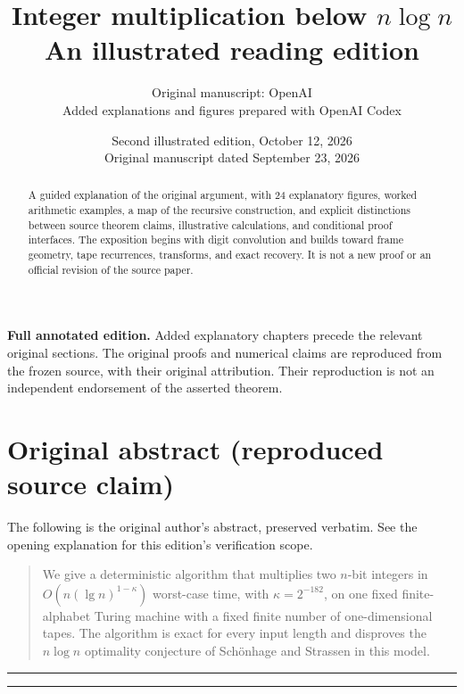 \documentclass[11pt]{article}
\title{Integer multiplication below $n\log n$\\[8pt]\large An illustrated reading edition}
\author{Original manuscript: OpenAI\\[5pt]\small Added explanations and figures prepared with OpenAI Codex}
\date{Second illustrated edition, October 12, 2026\\\small Original manuscript dated September 23, 2026}
\theoremstyle{definition}
\begin{document}
\maketitle
\begin{abstract}
A guided explanation of the original argument, with 24 explanatory figures,
worked arithmetic examples, a map of the recursive construction, and explicit
distinctions between source theorem claims, illustrative calculations, and
conditional proof interfaces. The exposition begins with digit convolution
and builds toward frame geometry, tape recurrences, transforms, and exact
recovery. It is not a new proof or an official revision of the source paper.
\end{abstract}

\noindent\textbf{Full annotated edition.} Added explanatory chapters precede
the relevant original sections. The original proofs and numerical claims
are reproduced from the frozen source, with their original attribution.
Their reproduction is not an independent endorsement of the asserted theorem.
\tableofcontents
\clearpage




\clearpage\section*{Original abstract (reproduced source claim)}
\noindent The following is the original author's abstract, preserved verbatim.
See the opening explanation for this edition's verification scope.
\begin{quote}

We give a deterministic algorithm that multiplies two $n$-bit integers
in $O(n(\lg n)^{1-\kappa})$ worst-case time, with
$\kappa=2^{-182}$, on one fixed finite-alphabet Turing machine with a
fixed finite number of one-dimensional tapes. The algorithm is exact
for every input length and disproves the $n\log n$ optimality conjecture
of Sch\"onhage and Strassen in this model.
\end{quote}
\par\bigskip{}\hrule\medskip\noindent{\small\textcolor{readerblue}{Original manuscript continues below.}}\par\medskip



\par\bigskip{}\hrule\medskip\noindent{\small\textcolor{readerblue}{Original manuscript continues below.}}\par\medskip
\end{document}
